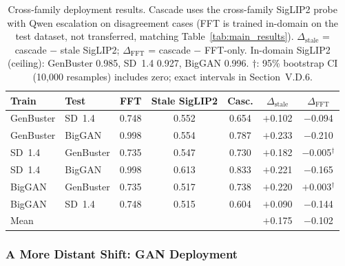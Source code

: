 \documentclass{ieeeaccess}
\begin{document}
\begin{table}[t]
\centering
\caption{Cross-family deployment results. Cascade uses the cross-family SigLIP2 probe
with Qwen escalation on disagreement cases (FFT is trained in-domain on the test
dataset, not transferred, matching Table~\ref{tab:main_results}).
$\Delta_{\text{stale}}$ = cascade $-$ stale SigLIP2; $\Delta_{\text{FFT}}$ = cascade $-$
FFT-only. In-domain SigLIP2 (ceiling): GenBuster 0.985, SD~1.4 0.927, BigGAN 0.996.
$\dagger$: 95\% bootstrap CI (10,000 resamples) includes zero; exact intervals in
Section~V.D.6.}
\label{tab:cross_family_deployment}
\footnotesize
\setlength{\tabcolsep}{4pt}
\begin{tabular}{llccccc}
\toprule
Train & Test & FFT & Stale SigLIP2 & Casc. & $\Delta_{\text{stale}}$ & $\Delta_{\text{FFT}}$ \\
\midrule
GenBuster & SD~1.4    & 0.748 & 0.552 & 0.654 & $+$0.102 & $-$0.094 \\
GenBuster & BigGAN    & 0.998 & 0.554 & 0.787 & $+$0.233 & $-$0.210 \\
SD~1.4    & GenBuster & 0.735 & 0.547 & 0.730 & $+$0.182 & $-$0.005$^\dagger$ \\
SD~1.4    & BigGAN    & 0.998 & 0.613 & 0.833 & $+$0.221 & $-$0.165 \\
BigGAN    & GenBuster & 0.735 & 0.517 & 0.738 & $+$0.220 & $+$0.003$^\dagger$ \\
BigGAN    & SD~1.4    & 0.748 & 0.515 & 0.604 & $+$0.090 & $-$0.144 \\
\midrule
\multicolumn{2}{l}{Mean} & & & & $+$0.175 & $-$0.102 \\
\bottomrule
\end{tabular}
\end{table}

\subsubsection{A More Distant Shift: GAN Deployment}
\label{sec:biggan_distant}
\end{document}
